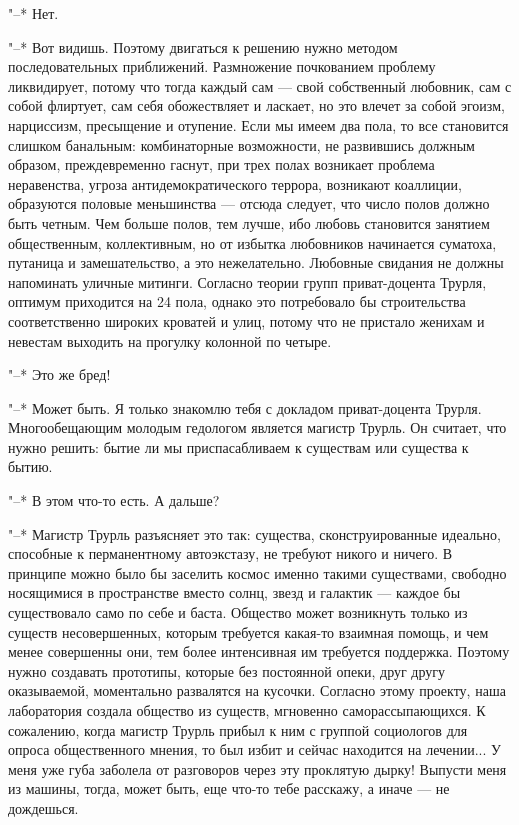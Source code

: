 "--* Нет.

"--* Вот видишь. Поэтому двигаться к решению нужно методом
последовательных приближений. Размножение почкованием
проблему ликвидирует, потому что тогда каждый сам --- свой
собственный любовник, сам с собой флиртует, сам себя
обожествляет и ласкает, но это влечет за собой эгоизм,
нарциссизм, пресыщение и отупение. Если мы имеем два пола,
то все становится слишком банальным: комбинаторные
возможности, не развившись должным образом, преждевременно
гаснут, при трех полах возникает проблема неравенства,
угроза антидемократического террора, возникают коаллиции,
образуются половые меньшинства --- отсюда следует, что число
полов должно быть четным. Чем больше полов, тем лучше, ибо
любовь становится занятием общественным, коллективным, но
от избытка любовников начинается суматоха, путаница и
замешательство, а это нежелательно. Любовные свидания не
должны напоминать уличные митинги. Согласно теории групп
приват-доцента Трурля, оптимум приходится на 24 пола, однако
это потребовало бы строительства соответственно широких
кроватей и улиц, потому что не пристало женихам и невестам
выходить на прогулку колонной по четыре.

"--* Это же бред!

"--* Может быть. Я только знакомлю тебя с докладом
приват-доцента Трурля. Многообещающим молодым гедологом
является магистр Трурль. Он считает, что нужно решить: бытие
ли мы приспасабливаем к существам или существа к бытию.

"--* В этом что-то есть. А дальше?

"--* Магистр Трурль разъясняет это так: существа,
сконструированные идеально, способные к перманентному
автоэкстазу, не требуют никого и ничего. В принципе можно
было бы заселить космос именно такими существами, свободно
носящимися в пространстве вместо солнц, звезд и галактик --- каждое
бы существовало само по себе и баста. Общество может
возникнуть только из существ несовершенных, которым
требуется какая-то взаимная помощь, и чем менее совершенны
они, тем более интенсивная им требуется поддержка. Поэтому
нужно создавать прототипы, которые без постоянной опеки,
друг другу оказываемой, моментально развалятся на кусочки.
Согласно этому проекту, наша лаборатория создала общество из
существ, мгновенно саморассыпающихся. К сожалению, когда
магистр Трурль прибыл к ним с группой социологов для опроса
общественного мнения, то был избит и сейчас находится на
лечении... У меня уже губа заболела от разговоров через эту
проклятую дырку! Выпусти меня из машины, тогда, может быть,
еще что-то тебе расскажу, а иначе --- не дождешься.

